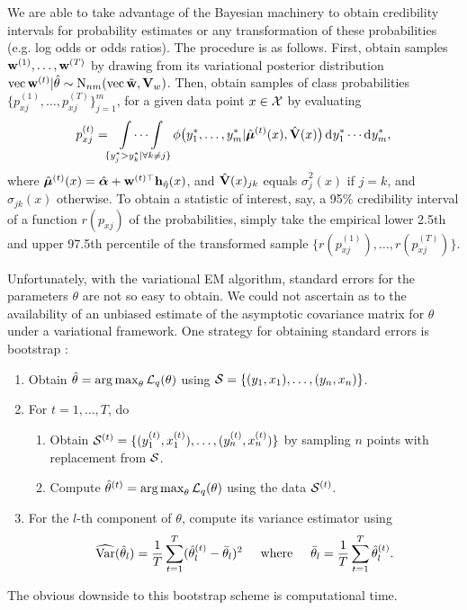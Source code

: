 We are able to take advantage of the Bayesian machinery to obtain credibility intervals for probability estimates or any transformation of these probabilities (e.g. log odds or odds ratios).
The procedure is as follows.
First, obtain samples ${\mathbf w}^{(1)},\dots,{\mathbf w}^{(T)}$ by drawing from its variational posterior distribution $\operatorname{vec}{\mathbf w}^{(t)}|\hat\theta \sim \operatorname{N}_{nm}(\operatorname{vec} \tilde{{\mathbf w}},{\mathbf V}_w)$.
Then, obtain samples of class probabilities $\{p_{xj}^{(1)},\dots, p_{xj}^{(T)} \}_{j=1}^m$, for a given data point $x\in{\mathcal X}$ by evaluating
\[
  p_{xj}^{(t)} = \idotsint\displaylimits_{\{y^*_j > y^*_k | \forall k \neq j \}} \phi\big(y_{1}^*, \dots, y_{m}^*|\hat{{\bm\mu}}^{(t)}(x), \hat{{\mathbf V}}(x)\big) \operatorname{d}\hspace{0.5pt}\! y_{1}^* \cdots \operatorname{d}\hspace{0.5pt}\! y_{m}^*,
\]
where $\hat{{\bm\mu}}^{(t)}(x) = \hat{{\bm\alpha}} + {\mathbf w}^{(t)\top}{\mathbf h}_{\hat\eta}(x)$, and $\hat{{\mathbf V}}(x)_{jk}$ equals $\hat\sigma^2_j(x)$ if $j = k$, and $\hat\sigma_{jk}(x)$ otherwise.
To obtain a statistic of interest, say, a 95\% credibility interval of a function $r(p_{xj})$ of the probabilities, simply take the empirical lower 2.5th and upper 97.5th percentile of the transformed sample $\big\{ r(p_{xj}^{(1)}),\dots, r(p_{xj}^{(T)}) \big\}$.

\begin{remark}
  Unfortunately, with the variational EM algorithm, standard errors for the parameters $\theta$ are not so easy to obtain.  
  We could not ascertain as to the availability of an unbiased estimate of the asymptotic covariance matrix for $\theta$ under a variational framework.
  One strategy for obtaining standard errors is bootstrap \citep{chen2017use}:
  \begin{enumerate}
    \item Obtain $\hat\theta = \operatorname*{arg\,max}_\theta {\mathcal L}_q(\theta)$ using ${\mathcal S} = \{(y_1,x_1),\dots, (y_n,x_n)\}$.
    \item For $t=1,\dots,T$, do
    \begin{enumerate}
      \item Obtain ${\mathcal S}^{(t)} = \{ (y_1^{(t)},x_1^{(t)}),\dots, (y_n^{(t)},x_n^{(t)})\}$ by sampling $n$ points with replacement from ${\mathcal S}$.
      \item Compute $\hat\theta^{(t)} = \operatorname*{arg\,max}_\theta {\mathcal L}_q(\theta)$ using the data ${\mathcal S}^{(t)}$.
    \end{enumerate}
    \item For the $l$-th component of $\theta$, compute its variance estimator using
    \[
      \widehat{\operatorname{Var}}(\hat\theta_l) = \frac{1}{T} \sum_{t=1}^T (\hat\theta_l^{(t)} - \bar\theta_l)^2
      \hspace{0.5cm}\text{where}\hspace{0.5cm}
      \bar\theta_l = \frac{1}{T} \sum_{t=1}^T \hat\theta_l^{(t)}.
    \]
  \end{enumerate}
  The obvious downside to this bootstrap scheme is computational time.
\end{remark}


